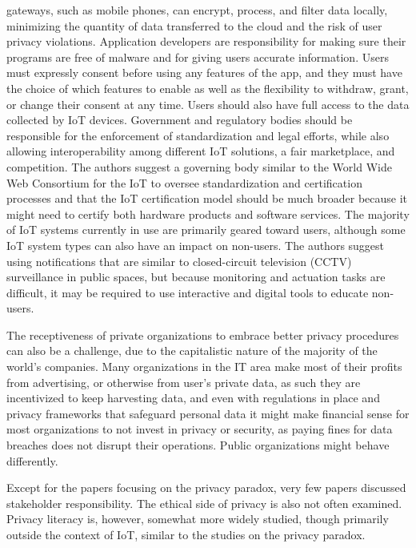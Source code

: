 gateways, such as mobile phones, can encrypt, process, and filter data locally,
minimizing the quantity of data transferred to the cloud and the risk of user
privacy violations. Application developers are responsibility for making sure
their programs are free of malware and for giving users accurate information.
Users must expressly consent before using any features of the app, and they must
have the choice of which features to enable as well as the flexibility to withdraw,
grant, or change their consent at any time. Users should also have full access
to the data collected by IoT devices. Government and regulatory bodies should be
responsible for the enforcement of standardization and legal efforts, while also
allowing interoperability among different IoT solutions, a fair marketplace,
and competition. The authors suggest a governing body similar to the World Wide
Web Consortium for the IoT to oversee standardization and certification processes
and that the IoT certification model should be much broader because it might need
to certify both hardware products and software services.
The majority of IoT systems currently in use are primarily geared toward users,
although some IoT system types can also have an impact on non-users. The authors
suggest using notifications that are similar to closed-circuit television (CCTV) surveillance in public spaces,
but because monitoring and actuation tasks are difficult, it may be required to use
interactive and digital tools to educate non-users.

The receptiveness of private organizations to embrace better privacy procedures
can also be a challenge, due to the capitalistic nature of the majority of the
world's companies. Many organizations in the IT area make most of their profits
from advertising, or otherwise from user's private data, as such they are incentivized
to keep harvesting data, and even with regulations in place and privacy frameworks
that safeguard personal data it might make financial sense for most organizations
to not invest in privacy or security, as paying fines for data breaches does not
disrupt their operations. Public organizations might behave differently.

Except for the papers focusing on the privacy paradox, very few papers discussed
stakeholder responsibility. The ethical side of privacy is also not often examined.
Privacy literacy is, however, somewhat more widely studied, though primarily
outside the context of IoT, similar to the studies on the privacy paradox.
